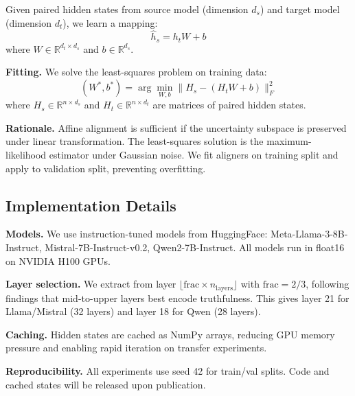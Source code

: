 Given paired hidden states from source model (dimension $d_s$) and target model (dimension $d_t$), we learn a mapping:
\begin{equation}
\hat{h}_s = h_t W + b
\end{equation}
where $W \in \mathbb{R}^{d_t \times d_s}$ and $b \in \mathbb{R}^{d_s}$.

\textbf{Fitting.} We solve the least-squares problem on training data:
\begin{equation}
(W^*, b^*) = \arg\min_{W,b} \|H_s - (H_t W + b)\|_F^2
\end{equation}
where $H_s \in \mathbb{R}^{n \times d_s}$ and $H_t \in \mathbb{R}^{n \times d_t}$ are matrices of paired hidden states.

\textbf{Rationale.} Affine alignment is sufficient if the uncertainty subspace is preserved under linear transformation. The least-squares solution is the maximum-likelihood estimator under Gaussian noise. We fit aligners on training split and apply to validation split, preventing overfitting.

\subsection{Implementation Details}

\textbf{Models.} We use instruction-tuned models from HuggingFace: Meta-Llama-3-8B-Instruct, Mistral-7B-Instruct-v0.2, Qwen2-7B-Instruct. All models run in float16 on NVIDIA H100 GPUs.

\textbf{Layer selection.} We extract from layer $\lfloor \text{frac} \times n_{\text{layers}} \rfloor$ with $\text{frac} = 2/3$, following findings that mid-to-upper layers best encode truthfulness. This gives layer 21 for Llama/Mistral (32 layers) and layer 18 for Qwen (28 layers).

\textbf{Caching.} Hidden states are cached as NumPy arrays, reducing GPU memory pressure and enabling rapid iteration on transfer experiments.

\textbf{Reproducibility.} All experiments use seed 42 for train/val splits. Code and cached states will be released upon publication.
